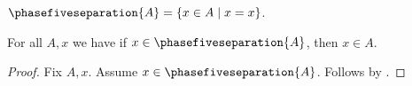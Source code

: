 \begin{definition}\label{phase5_separation_definition}
    $\phasefiveseparation{A} = \{ x \in A \mid x = x \}$.
\end{definition}

\begin{proposition}\label{phase5_separation_theorem}
    For all $A, x$ we have if $x \in \phasefiveseparation{A}$, then $x \in A$.
\end{proposition}
\begin{proof}
    Fix $A, x$.
    Assume $x \in \phasefiveseparation{A}$.
    Follows by .
\end{proof}
